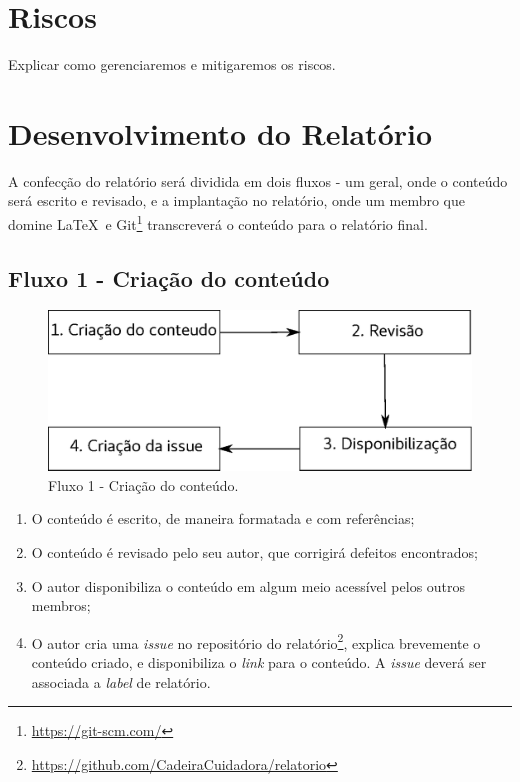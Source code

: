 \section{Riscos}

Explicar como gerenciaremos e mitigaremos os riscos.

\section{Desenvolvimento do Relatório}

A confecção do relatório será dividida em dois fluxos - um geral, onde o
conteúdo será escrito e revisado, e a implantação no relatório, onde um
membro que domine \LaTeX\ e
Git\footnote{\url{https://git-scm.com/}} transcreverá o conteúdo para o
relatório final.

\subsection{Fluxo 1 - Criação do conteúdo}

\begin{figure}[H]
  \centering
    \includegraphics{figuras/fluxo1.eps}
  \caption{Fluxo 1 - Criação do conteúdo.}
  \label{fig:fluxo1}
\end{figure}

\begin{enumerate}
  \item O conteúdo é escrito, de maneira formatada e com referências;
  \item O conteúdo é revisado pelo seu autor, que corrigirá defeitos encontrados;
  \item O autor disponibiliza o conteúdo em algum meio acessível pelos outros membros;
  \item O autor cria uma \textit{issue} no repositório do
    relatório\footnote{\url{https://github.com/CadeiraCuidadora/relatorio}}, explica brevemente
    o conteúdo criado, e disponibiliza o \textit{link} para o conteúdo. A \textit{issue} deverá ser associada a \textit{label} de relatório.
\end{enumerate}

